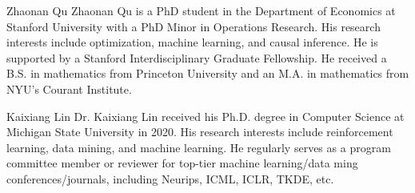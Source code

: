 \documentclass[journal]{IEEEtran}
\begin{document}

%









% 
\newpage

%




  
\newpage
\begin{IEEEbiography}{Zhaonan Qu}
Zhaonan Qu is a PhD student in the Department of Economics at Stanford University with a PhD Minor in Operations Research. His research interests include optimization, machine learning, and causal inference. He is supported by a Stanford Interdisciplinary Graduate Fellowship. He received a B.S. in mathematics from Princeton University and an M.A. in mathematics from NYU's Courant Institute.
\end{IEEEbiography}

\begin{IEEEbiography}{Kaixiang Lin}
Dr. Kaixiang Lin received his Ph.D. degree in Computer Science at 
Michigan State University in 2020. His research interests include 
reinforcement learning, data mining, and machine learning. 
He regularly serves as a program committee member or reviewer for top-tier machine learning/data ming conferences/journals, including Neurips, ICML, ICLR, TKDE, etc.
\end{IEEEbiography}
\end{document}
